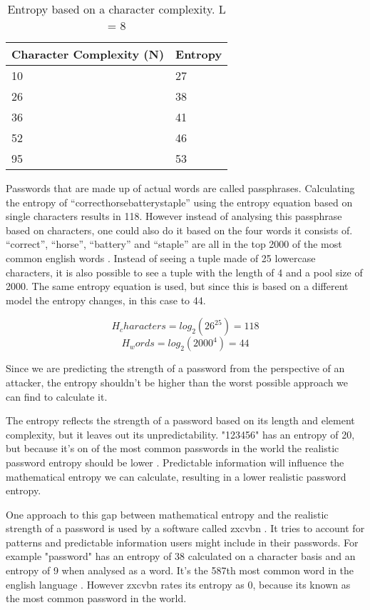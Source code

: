 \begin{table}[h!]
\centering
\begin{tabular}{l l}
    Character Complexity (N) & Entropy \\
    \hline
    10                       & 27 \\
    26                       & 38 \\
    36                       & 41 \\
    52                       & 46 \\
    95                       & 53
\end{tabular}
\caption{Entropy based on a character complexity. L = 8}
\end{table}

Passwords that are made up of actual words are called passphrases. Calculating the entropy of ``correcthorsebatterystaple'' using the entropy equation based on single characters results in 118. However instead of analysing this passphrase based on characters, one could also do it based on the four words it consists of. ``correct'', ``horse'', ``battery'' and ``staple'' are all in the top 2000 of the most common english words \cite{commonwords}. Instead of seeing a tuple made of 25 lowercase characters, it is also possible to see a tuple with the length of 4 and a pool size of 2000. The same entropy equation is used, but since this is based on a different model the entropy changes, in this case to 44.

\begin{equation}
H_characters = log_2(26^25) = 118
\end{equation}
\begin{equation}
H_words = log_2(2000^4) = 44
\end{equation}

Since we are predicting the strength of a password from the perspective of an attacker, the entropy shouldn't be higher than the worst possible approach we can find to calculate it.

The entropy reflects the strength of a password based on its length and element complexity, but it leaves out its unpredictability. "123456" has an entropy of 20, but because it's on of the most common passwords in the world the realistic password entropy should be lower \cite{passwordquality}. Predictable information will influence the mathematical entropy we can calculate, resulting in a lower realistic password entropy.

One approach to this gap between mathematical entropy and the realistic strength of a password is used by a software called zxcvbn \cite{zxcvbn}. It tries to account for patterns and predictable information users might include in their passwords. For example "password" has an entropy of 38 calculated on a character basis and an entropy of 9 when analysed as a word. It's the 587th most common word in the english language \cite{commonwords}. However zxcvbn rates its entropy as 0, because its known as the most common password in the world.

\newpage